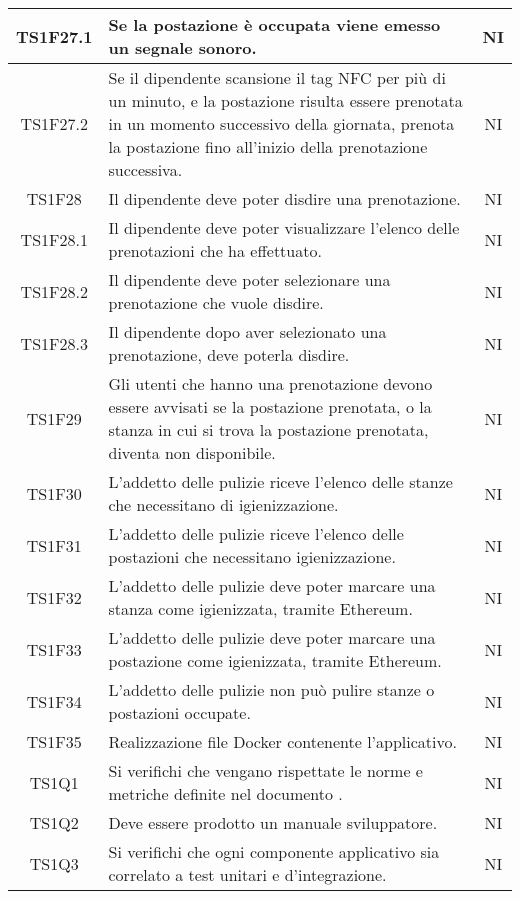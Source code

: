 \begin{center}
\begin{longtable}{|c|p{10cm}|c|}
			\hline
			TS1F27.1 & Se la postazione è occupata viene emesso un segnale sonoro. & NI \\	
			\hline
			TS1F27.2 & Se il dipendente scansione il tag NFC per più di un minuto, e la postazione risulta essere prenotata in un momento successivo della giornata, prenota la postazione fino all'inizio della prenotazione successiva. & NI \\	
			\hline
			TS1F28 & Il dipendente deve poter disdire una prenotazione. & NI \\	
			\hline
			TS1F28.1 & Il dipendente deve poter visualizzare l'elenco delle prenotazioni che ha effettuato. & NI \\	
			\hline
			TS1F28.2 & Il dipendente deve poter selezionare una prenotazione che vuole disdire. & NI \\	
			\hline
			TS1F28.3 & Il dipendente dopo aver selezionato una prenotazione, deve poterla disdire. & NI \\	
			\hline
			TS1F29 & Gli utenti che hanno una prenotazione devono essere avvisati se la postazione prenotata, o la stanza in cui si trova la postazione prenotata, diventa non disponibile. & NI \\	
			\hline
			TS1F30 & L'addetto delle pulizie riceve l'elenco delle stanze che necessitano di igienizzazione. & NI \\	
			\hline
			TS1F31 & L'addetto delle pulizie riceve l'elenco delle postazioni che necessitano igienizzazione. & NI \\	
			\hline
			TS1F32 & L'addetto delle pulizie deve poter marcare una stanza come igienizzata, tramite Ethereum. & NI \\	
			\hline
			TS1F33 & L'addetto delle pulizie deve poter marcare una postazione come igienizzata, tramite Ethereum. & NI \\	
			\hline
			TS1F34 & L'addetto delle pulizie non può pulire stanze o postazioni occupate. & NI \\	
			\hline
			TS1F35 & Realizzazione file Docker contenente l'applicativo. & NI \\	
			\hline
			TS1Q1 & Si verifichi che vengano rispettate le norme e metriche definite nel documento \dext{Piano di Qualifica v. 1.0.0}. & NI \\	
			\hline			
			TS1Q2 & Deve essere prodotto un manuale sviluppatore. & NI \\	
			\hline	
			TS1Q3 & Si verifichi che ogni componente applicativo sia correlato a test unitari e d'integrazione. & NI \\	

\end{longtable}
\end{center}
